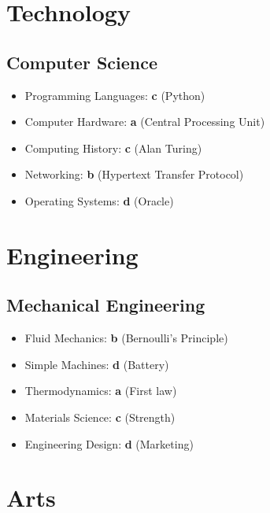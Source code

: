 \documentclass[12pt,a4paper]{book}
\begin{document}
\section{Technology}
\subsection{Computer Science}
\begin{itemize}
\item Programming Languages: \textbf{c} (Python)
\item Computer Hardware: \textbf{a} (Central Processing Unit)
\item Computing History: \textbf{c} (Alan Turing)
\item Networking: \textbf{b} (Hypertext Transfer Protocol)
\item Operating Systems: \textbf{d} (Oracle)
\end{itemize}

\section{Engineering}
\subsection{Mechanical Engineering}
\begin{itemize}
\item Fluid Mechanics: \textbf{b} (Bernoulli's Principle)
\item Simple Machines: \textbf{d} (Battery)
\item Thermodynamics: \textbf{a} (First law)
\item Materials Science: \textbf{c} (Strength)
\item Engineering Design: \textbf{d} (Marketing)
\end{itemize}

\section{Arts}
\end{document}

